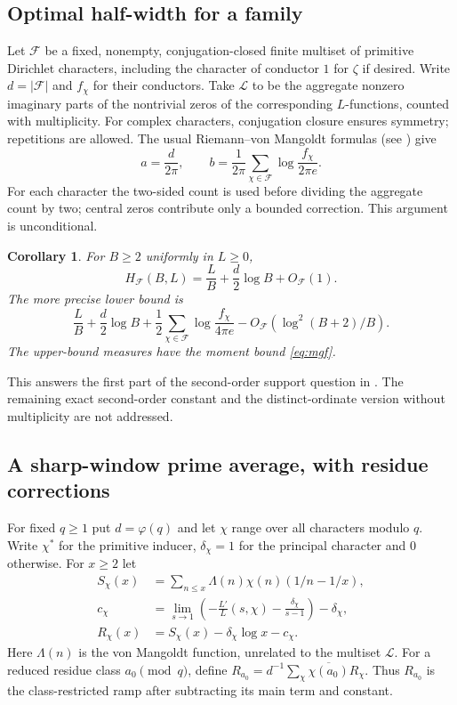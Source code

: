 \documentclass[11pt,letterpaper]{article}
\newtheorem{corollary}[theorem]{Corollary}
\theoremstyle{remark}\newtheorem{remark}[theorem]{Remark}
\newcommand{\F}{\mathcal F}\newcommand{\Lam}{\mathcal L}
\begin{document}
\subsection{Optimal half-width for a family}
Let $\F$ be a fixed, nonempty, conjugation-closed finite multiset of primitive Dirichlet characters, including the character of conductor $1$ for $\zeta$ if desired. Write $d=|\F|$ and $f_\chi$ for their conductors. Take $\Lam$ to be the aggregate nonzero imaginary parts of the nontrivial zeros of the corresponding $L$-functions, counted with multiplicity. For complex characters, conjugation closure ensures symmetry; repetitions are allowed. The usual Riemann--von Mangoldt formulas (see \cite{Bennett,Titchmarsh}) give
\[
 a=\frac d{2\pi},\qquad b=\frac1{2\pi}\sum_{\chi\in\F}\log\frac{f_\chi}{2\pi e}.
\]
For each character the two-sided count is used before dividing the aggregate count by two; central zeros contribute only a bounded correction. This argument is unconditional.
\begin{corollary}\label{cor:dir}
For $B\ge2$ uniformly in $L\ge0$,
\[
 H_{\F}(B,L)=\frac LB+\frac d2\log B+O_\F(1).
\]
The more precise lower bound is
\[
 \frac LB+\frac d2\log B+\frac12\sum_{\chi\in\F}\log\frac{f_\chi}{4\pi e}
 -O_\F(\log^2(B+2)/B).
\]
The upper-bound measures have the moment bound \eqref{eq:mgf}.
\end{corollary}
This answers the first part of the second-order support question in \cite[\texttt{fil:sec:open}]{ProveIt}. The remaining exact second-order constant and the distinct-ordinate version without multiplicity are not addressed.

\subsection{A sharp-window prime average, with residue corrections}
For fixed $q\ge1$ put $d=\varphi(q)$ and let $\chi$ range over all characters modulo $q$. Write $\chi^*$ for the primitive inducer, $\delta_\chi=1$ for the principal character and $0$ otherwise. For $x\ge2$ let
\begin{align*}
 S_\chi(x)&=\sum_{n\le x}\Lambda(n)\chi(n)(1/n-1/x),\\
 c_\chi&=\lim_{s\to1}\left(-\frac{L'}{L}(s,\chi)-\frac{\delta_\chi}{s-1}\right)-\delta_\chi,\\
 R_\chi(x)&=S_\chi(x)-\delta_\chi\log x-c_\chi.
\end{align*}
Here $\Lambda(n)$ is the von Mangoldt function, unrelated to the multiset $\Lam$. For a reduced residue class $a_0\pmod q$, define $R_{a_0}=d^{-1}\sum_\chi\overline{\chi(a_0)}R_\chi$. Thus $R_{a_0}$ is the class-restricted ramp after subtracting its main term and constant.
\end{document}
